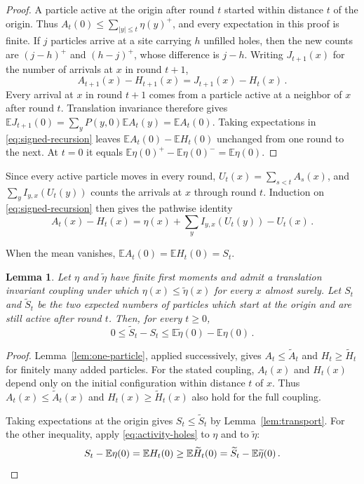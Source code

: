 \documentclass[11pt]{amsart}
\theoremstyle{plain}
\newtheorem{lemma}[theorem]{Lemma}
\theoremstyle{definition}
\newcommand{\E}{\mathbb{E}}
\begin{document}
\begin{proof}
	A particle active at the origin after round $t$ started within distance $t$
	of the origin. Thus $A_t(0)\leq\sum_{|y|\leq t}\eta(y)^+$, and every
	expectation in this proof is finite. If $j$ particles arrive at a site
	carrying $h$ unfilled holes,
	then the new counts are $(j-h)^+$ and $(h-j)^+$, whose difference is $j-h$.
	Writing $J_{t+1}(x)$ for the number of arrivals at $x$ in round $t+1$,
	\begin{equation}\label{eq:signed-recursion}
		A_{t+1}(x)-H_{t+1}(x)=J_{t+1}(x)-H_t(x)\,.
	\end{equation}
	Every arrival at $x$ in round $t+1$ comes from a particle active at a neighbor
	of $x$ after round $t$. Translation invariance therefore gives
	$\E J_{t+1}(0)=\sum_yP(y,0)\E A_t(y)=\E A_t(0)$. Taking expectations in
	\eqref{eq:signed-recursion} leaves $\E A_t(0)-\E H_t(0)$ unchanged
	from one round to the next. At $t=0$ it equals
	$\E\eta(0)^+-\E\eta(0)^-=\E\eta(0)$.
\end{proof}

Since every active particle moves in every round, $U_t(x)=\sum_{s<t}A_s(x)$,
and $\sum_yI_{y,x}(U_t(y))$ counts the arrivals at $x$ through round $t$.
Induction on \eqref{eq:signed-recursion} then gives the pathwise identity
\begin{equation}\label{eq:signed-count}
	A_t(x)-H_t(x)=\eta(x)+\sum_yI_{y,x}(U_t(y))-U_t(x)\,.
\end{equation}

When the mean vanishes, $\E A_t(0)=\E H_t(0)=S_t$.

\begin{lemma}\label{lem:density-compare}
	Let $\eta$ and $\widetilde\eta$ have finite first moments and admit a
	translation invariant coupling under which
	$\eta(x)\leq\widetilde\eta(x)$ for every $x$ almost surely. Let $S_t$ and
	$\widetilde S_t$ be the two expected numbers of particles which start at
	the origin and are still active after round $t$. Then, for every $t\geq0$,
	\[
		0\leq\widetilde S_t-S_t
		\leq\E\widetilde\eta(0)-\E\eta(0)\,.
	\]
\end{lemma}

\begin{proof}
	Lemma~\ref{lem:one-particle}, applied successively, gives
	$A_t\leq\widetilde A_t$ and $H_t\geq\widetilde H_t$ for finitely many added
	particles. For the stated coupling, $A_t(x)$ and $H_t(x)$ depend only on the
	initial configuration within distance $t$ of $x$. Thus
	$A_t(x)\leq\widetilde A_t(x)$ and
	$H_t(x)\geq\widetilde H_t(x)$ also hold for the full coupling.

	Taking expectations at the origin gives $S_t\leq\widetilde S_t$ by
	Lemma~\ref{lem:transport}. For the other inequality, apply
	\eqref{eq:activity-holes} to $\eta$ and to $\widetilde\eta$:
	\[
		S_t-\E\eta(0)=\E H_t(0)\geq\E\widetilde H_t(0)
		=\widetilde S_t-\E\widetilde\eta(0)\,. \qedhere
	\]
\end{proof}
\end{document}
